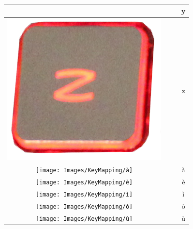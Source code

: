 \begin{longtable}{cccc}
\begin{minipage}[c]{.3\textwidth}
\vspace{0.2cm}
\end{minipage} & & & y\\
\hline
\begin{minipage}[c]{.3\textwidth}
\vspace{0.2cm}
\includegraphics[scale=0.1]{Images/KeyMapping/z}
\vspace{0.2cm}
\end{minipage} & & & z\\
\hline
\begin{minipage}[c]{.3\textwidth}
\vspace{0.2cm}
\texttt{[image: Images/KeyMapping/à]}
\vspace{0.2cm}
\end{minipage} & & & à\\
\hline
\begin{minipage}[c]{.3\textwidth}
\vspace{0.2cm}
\texttt{[image: Images/KeyMapping/è]}
\vspace{0.2cm}
\end{minipage} & & & è\\
\hline
\begin{minipage}[c]{.3\textwidth}
\vspace{0.2cm}
\texttt{[image: Images/KeyMapping/ì]}
\vspace{0.2cm}
\end{minipage} & & & ì\\
\hline
\begin{minipage}[c]{.3\textwidth}
\vspace{0.2cm}
\texttt{[image: Images/KeyMapping/ò]}
\vspace{0.2cm}
\end{minipage} & & & ò\\
\hline
\begin{minipage}[c]{.3\textwidth}
\vspace{0.2cm}
\texttt{[image: Images/KeyMapping/ù]}
\vspace{0.2cm}
\end{minipage} & & & ù\\
\hline
\end{longtable}
